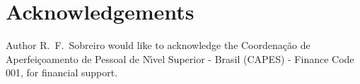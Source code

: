 \documentclass[../main.tex]{subfiles}
\begin{document}
\section*{Acknowledgements}
Author R.~F.~Sobreiro would like to acknowledge the Coordena{\c{c}}{\~{a}}o de Aperfei{\c{c}}oamento de Pessoal de N{\'{\i}}vel Superior - Brasil
(CAPES) - Finance Code 001, for financial support.
\end{document}
